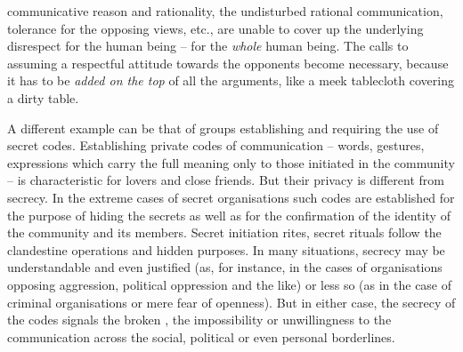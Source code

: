communicative reason and rationality, the {undisturbed rational communication},
{tolerance for the opposing views}, etc., are unable to cover up the underlying
disrespect for the human being -- for the {\em whole} human being. The calls to
assuming a respectful attitude towards the opponents become necessary, because
it has to be {\em added on the top} of all the arguments, like a meek tablecloth
covering a dirty table.


\pa A different example can be that of groups establishing and requiring the use
of secret codes.  Establishing {private codes} of communication -- words,
gestures, expressions which carry the full meaning only to those initiated in
the {community} -- is characteristic for lovers and close friends. But
their privacy is different from secrecy.  In the extreme cases of secret
organisations such {codes} are established for the purpose of hiding the
secrets as well as for the confirmation of the identity of the community and its
members. Secret initiation rites, secret rituals follow the clandestine
operations and hidden purposes. In many situations, secrecy may be
understandable and even justified (as, for instance, in the cases of
organisations opposing aggression, political oppression and the like) or less so
(as in the case of criminal organisations or mere fear of openness). But in
either case, the secrecy of the codes signals the broken , the
impossibility or unwillingness to  the communication across the
social, political or even personal borderlines.

